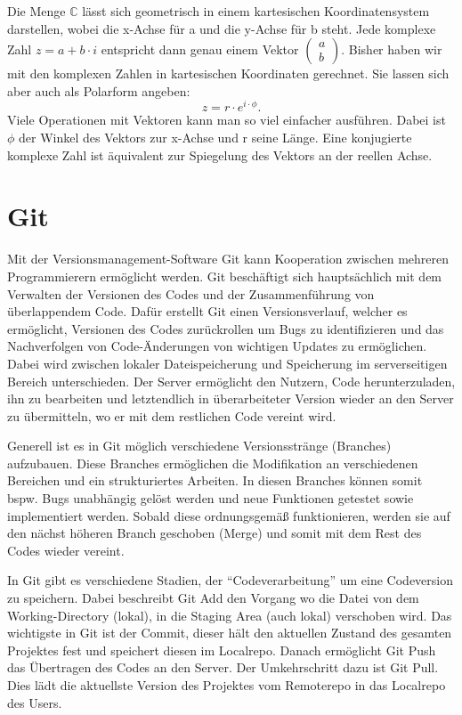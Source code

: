 \documentclass[]{dsadokumentation}
\begin{document}
Die Menge $\mathbb{C}$ lässt sich geometrisch in einem kartesischen Koordinatensystem darstellen, wobei die x-Achse für a und die y-Achse für b steht. Jede komplexe Zahl $z=a+b\cdot i$ entspricht dann genau einem Vektor $\begin{pmatrix} a \\b
  \end{pmatrix}$.
Bisher haben wir mit den komplexen Zahlen in kartesischen Koordinaten gerechnet. Sie lassen sich aber auch als Polarform angeben:
\begin{equation}
  z=r\cdot e^{i\cdot\phi}.
\end{equation}
Viele Operationen mit Vektoren kann man so viel einfacher ausführen. Dabei ist $\phi$ der Winkel des Vektors zur x-Achse und r seine Länge. Eine konjugierte komplexe Zahl ist äquivalent zur Spiegelung des Vektors an der reellen Achse.

\section{Git}
Mit der Versionsmanagement-Software Git kann Kooperation zwischen mehreren Programmierern ermöglicht werden. Git beschäftigt sich hauptsächlich mit dem Verwalten der Versionen des Codes und der Zusammenführung von überlappendem Code. Dafür erstellt Git einen Versionsverlauf, welcher es ermöglicht, Versionen des Codes zurückrollen um Bugs zu identifizieren und das Nachverfolgen von Code-Änderungen von wichtigen Updates zu ermöglichen. Dabei wird zwischen lokaler Dateispeicherung und Speicherung im serverseitigen Bereich unterschieden. Der Server ermöglicht den Nutzern, Code herunterzuladen, ihn zu bearbeiten und letztendlich in überarbeiteter Version wieder an den Server zu übermitteln, wo er mit dem restlichen Code vereint wird.

Generell ist es in Git möglich verschiedene Versionsstränge (Branches) aufzubauen. Diese Branches ermöglichen die Modifikation an verschiedenen Bereichen und ein strukturiertes Arbeiten. In diesen Branches können somit bspw. Bugs unabhängig gelöst werden und neue Funktionen getestet sowie implementiert werden. Sobald diese ordnungsgemäß funktionieren, werden sie auf den nächst höheren Branch geschoben (Merge) und somit mit dem Rest des Codes wieder vereint.

In Git gibt es verschiedene Stadien, der \enquote{Codeverarbeitung} um eine Codeversion zu speichern. Dabei beschreibt Git Add den Vorgang wo die Datei von dem Working-Directory (lokal), in die Staging Area (auch lokal) verschoben wird. Das wichtigste in Git ist der Commit, dieser hält den aktuellen Zustand des gesamten Projektes fest und speichert diesen im Localrepo. Danach ermöglicht Git Push das Übertragen des Codes an den Server. Der Umkehrschritt dazu ist Git Pull. Dies lädt die aktuellste Version des Projektes vom Remoterepo in das Localrepo des Users.
\end{document}
